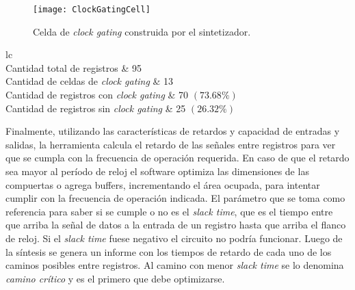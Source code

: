 \begin{figure}
	\centering
	\texttt{[image: ClockGatingCell]}
	\caption{Celda de \emph{clock gating} construida por el 
	sintetizador.}
	\label{fig:CeldaClockGating}
\end{figure}

\begin{table}
	\centering
	\begin{tabu}{lc}
		\toprule
		 \\
		\midrule
		Cantidad total de registros                   &      95      \\
		Cantidad de celdas de \emph{clock gating}  & 13           \\
		Cantidad de registros con \emph{clock gating} & 70 \((73.68\%)\) \\
		Cantidad de registros sin \emph{clock gating} & 25 \((26.32\%)\) \\
		\bottomrule
	\end{tabu}
	
	\caption{Resultado arrojado por la herramienta de síntesis luego de
	aplicar la técnica de \emph{clock gating} al diseño.}
	
	\label{tab:ResumenClockGating}
\end{table}

Finalmente, utilizando las características de retardos y capacidad de 
entradas y salidas, la herramienta calcula el retardo de las señales 
entre registros para ver que se cumpla con la frecuencia de operación 
requerida. En caso de que el retardo sea mayor al período de reloj el 
software optimiza las dimensiones de las compuertas o agrega buffers, 
incrementando el área ocupada, para intentar cumplir con la frecuencia de 
operación indicada. El parámetro que se toma como referencia para 
saber si se cumple o no es el \emph{slack time}, que es el tiempo 
entre que arriba la señal de datos a la entrada de un registro hasta 
que arriba el flanco de reloj. Si el \emph{slack time} fuese negativo 
el circuito no podría funcionar. Luego de la síntesis se genera un 
informe con los tiempos de retardo de cada uno de los caminos posibles 
entre registros. Al camino con menor \emph{slack time} se lo denomina 
\emph{camino crítico} y es el primero que debe optimizarse. 

